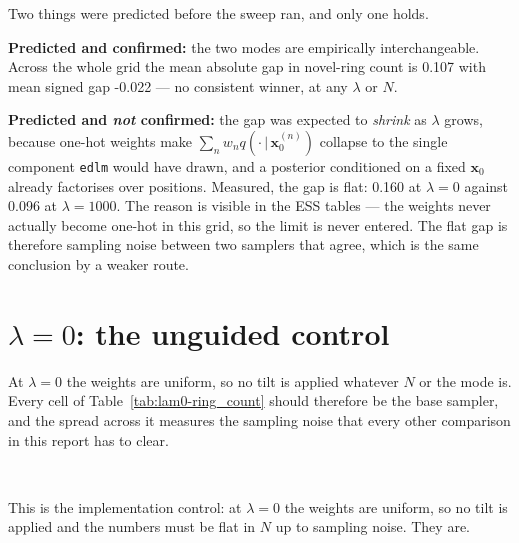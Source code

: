 \documentclass[11pt]{article}
\begin{document}
Two things were predicted before the sweep ran, and only one holds.

\textbf{Predicted and confirmed:} the two modes are empirically
interchangeable. Across the whole grid the mean absolute gap in novel-ring count is
0.107 with mean signed gap
-0.022 --- no consistent winner, at any $\lambda$ or $N$.

\textbf{Predicted and \emph{not} confirmed:} the gap was expected to
\emph{shrink} as $\lambda$ grows, because one-hot weights make
$\sum_n w_n q(\cdot\,|\,\mathbf{x}_0^{(n)})$ collapse to the single component
\texttt{edlm} would have drawn, and a posterior conditioned on a fixed
$\mathbf{x}_0$ already factorises over positions. Measured, the gap is flat:
0.160 at $\lambda=0$ against
0.096 at $\lambda=1000$. The reason is
visible in the ESS tables --- the weights never actually become one-hot in this
grid, so the limit is never entered. The flat gap is therefore sampling noise
between two samplers that agree, which is the same conclusion by a weaker route.

\section{$\lambda = 0$: the unguided control}

At $\lambda=0$ the weights are uniform, so no tilt is applied whatever $N$ or the
mode is. Every cell of Table~\ref{tab:lam0-ring_count} should therefore be
the base sampler, and the spread across it measures the sampling noise that every
other comparison in this report has to clear.

\begin{table}[htbp]
\centering
\small
{}
\\[0.4em] \begin{minipage}{0.92\textwidth}\footnotesize This is the implementation control: at $\lambda=0$ the weights are uniform, so no tilt is applied and the numbers must be flat in $N$ up to sampling noise. They are.\end{minipage}
\caption{novel-ring count at $\lambda=0$. Every entry should be the base sampler, independent of $N$ and of the mode.}
\label{tab:lam0-ring_count}
\end{table}
\end{document}
